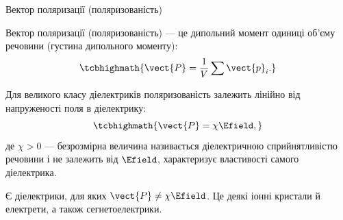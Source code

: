 \documentclass[]{beamer}
\begin{document}
\begin{frame}{Вектор поляризації (поляризованість)}{}\small
	\begin{block}{}\justifying
		\alert{Вектор поляризації (поляризованість)} --- це дипольний момент одиниці об'єму
		речовини (густина дипольного моменту):
		\begin{equation*}
			\tcbhighmath{
				\vect{P} = \dfrac1V \sum \vect{p}_i.
			}
		\end{equation*}
	\end{block}

	\begin{block}{}\justifying
		Для великого класу діелектриків \alert{поляризованість залежить лінійно
			від напруженості поля} в діелектрику:
		\begin{equation*}
			\tcbhighmath{
				\vect{P} = \chi \Efield,
			}
		\end{equation*}
		де $\chi > 0$ --- безрозмірна величина називається \alert{діелектричною сприйнятливістю
			речовини} і не залежить від $\Efield$, характеризує властивості самого діелектрика.
	\end{block}


	\begin{alertblock}{}\justifying\scriptsize
		Є діелектрики, для яких $\vect{P} \neq \chi \Efield$. Це деякі іонні кристали й
		електрети, а також сегнетоелектрики.
	\end{alertblock}

\end{frame}
\end{document}
